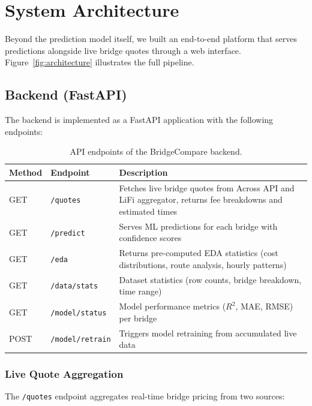 \section{System Architecture}\label{sec: system_arch}

Beyond the prediction model itself, we built an end-to-end platform that serves predictions alongside live bridge quotes through a web interface. Figure~\ref{fig:architecture} illustrates the full pipeline.

\subsection{Backend (FastAPI)}

The backend is implemented as a FastAPI application with the following endpoints:

\begin{table}[h]
\centering
\caption{API endpoints of the BridgeCompare backend.}
\label{tab:api_endpoints}
\begin{tabular}{llp{6.5cm}}
\toprule
\textbf{Method} & \textbf{Endpoint} & \textbf{Description} \\
\midrule
GET  & \texttt{/quotes} & Fetches live bridge quotes from Across API and LiFi aggregator, returns fee breakdowns and estimated times \\
GET  & \texttt{/predict} & Serves ML predictions for each bridge with confidence scores \\
GET  & \texttt{/eda} & Returns pre-computed EDA statistics (cost distributions, route analysis, hourly patterns) \\
GET  & \texttt{/data/stats} & Dataset statistics (row counts, bridge breakdown, time range) \\
GET  & \texttt{/model/status} & Model performance metrics ($R^2$, MAE, RMSE) per bridge \\
POST & \texttt{/model/retrain} & Triggers model retraining from accumulated live data \\
\bottomrule
\end{tabular}
\end{table}

\subsubsection{Live Quote Aggregation}

The \texttt{/quotes} endpoint aggregates real-time bridge pricing from two sources:

